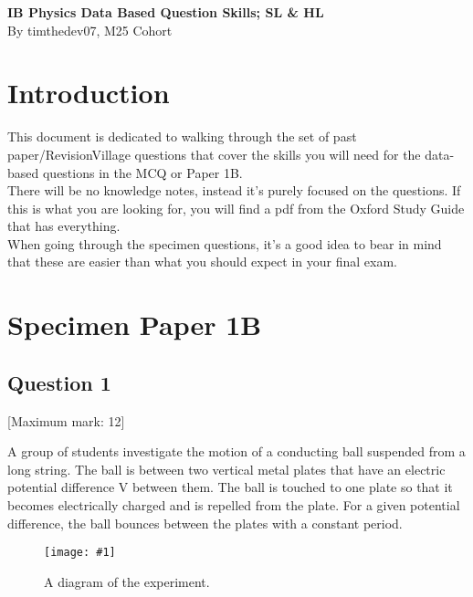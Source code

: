 \documentclass[a4paper,12pt]{article}
\let\oldsection\section
\renewcommand\section{\clearpage\oldsection}
\let\oldsubsection\subsection
\renewcommand\subsection{\clearpage\oldsubsection}
\newcommand{\lb}{\\[8pt]}
\newcommand{\img}[4]{\begin{center}
  \begin{figure}[H]
    \centering
    \texttt{[image: \#1]}
    \caption{#3}
    \label{fig:#4}
  \end{figure}
\end{center}}
\begin{document}
\pagestyle{fancy}


\begin{titlepage}
  \begin{center}

    \vspace*{8cm}
    \textbf{\Large {IB Physics Data Based Question Skills; SL \& HL}} \\
    \vspace*{1cm}
    \large{By timthedev07, M25 Cohort}

  \end{center}
\end{titlepage}

\pagebreak
\tableofcontents
\pagebreak

\clearpage
\setcounter{page}{1}

\section{Introduction}

This document is dedicated to walking through the set of past paper/RevisionVillage questions that cover the skills you will need for the data-based questions in the MCQ or Paper 1B.\lb
There will be no knowledge notes, instead it's purely focused on the questions. If this is what you are looking for, you will find a pdf from the Oxford Study Guide that has everything.\lb
When going through the specimen questions, it's a good idea to bear in mind that these are easier than what you should expect in your final exam.

\section{Specimen Paper 1B}

\oldsubsection{Question 1}

[Maximum mark: 12]

A group of students investigate the motion of a conducting ball suspended from a long string.
The ball is between two vertical metal plates that have an electric potential difference V
between them. The ball is touched to one plate so that it becomes electrically charged and
is repelled from the plate. For a given potential difference, the ball bounces between the
plates with a constant period.

\img{ex/1.png}{0.3}{A diagram of the experiment.}{1}
\end{document}
